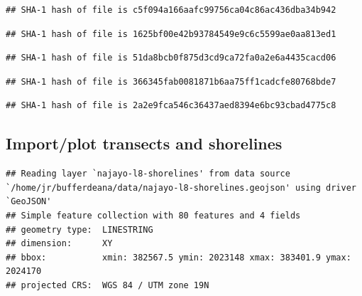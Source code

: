 \documentclass[11pt,]{article}
\newenvironment{Shaded}{\begin{snugshade}}{\end{snugshade}}
\newcommand{\KeywordTok}[1]{\textcolor[rgb]{0.13,0.29,0.53}{\textbf{#1}}}
\newcommand{\DataTypeTok}[1]{\textcolor[rgb]{0.13,0.29,0.53}{#1}}
\newcommand{\StringTok}[1]{\textcolor[rgb]{0.31,0.60,0.02}{#1}}
\newcommand{\CommentTok}[1]{\textcolor[rgb]{0.56,0.35,0.01}{\textit{#1}}}
\newcommand{\OperatorTok}[1]{\textcolor[rgb]{0.81,0.36,0.00}{\textbf{#1}}}
\newcommand{\NormalTok}[1]{#1}
\begin{document}
\begin{verbatim}
## SHA-1 hash of file is c5f094a166aafc99756ca04c86ac436dba34b942
\end{verbatim}

\begin{verbatim}
## SHA-1 hash of file is 1625bf00e42b93784549e9c6c5599ae0aa813ed1
\end{verbatim}

\begin{verbatim}
## SHA-1 hash of file is 51da8bcb0f875d3cd9ca72fa0a2e6a4435cacd06
\end{verbatim}

\begin{verbatim}
## SHA-1 hash of file is 366345fab0081871b6aa75ff1cadcfe80768bde7
\end{verbatim}

\begin{verbatim}
## SHA-1 hash of file is 2a2e9fca546c36437aed8394e6bc93cbad4775c8
\end{verbatim}

\subsection{Import/plot transects and
shorelines}\label{importplot-transects-and-shorelines}

\begin{Shaded}
\end{Shaded}

\begin{verbatim}
## Reading layer `najayo-l8-shorelines' from data source `/home/jr/bufferdeana/data/najayo-l8-shorelines.geojson' using driver `GeoJSON'
## Simple feature collection with 80 features and 4 fields
## geometry type:  LINESTRING
## dimension:      XY
## bbox:           xmin: 382567.5 ymin: 2023148 xmax: 383401.9 ymax: 2024170
## projected CRS:  WGS 84 / UTM zone 19N
\end{verbatim}

\begin{Shaded}
\end{Shaded}
\end{document}
